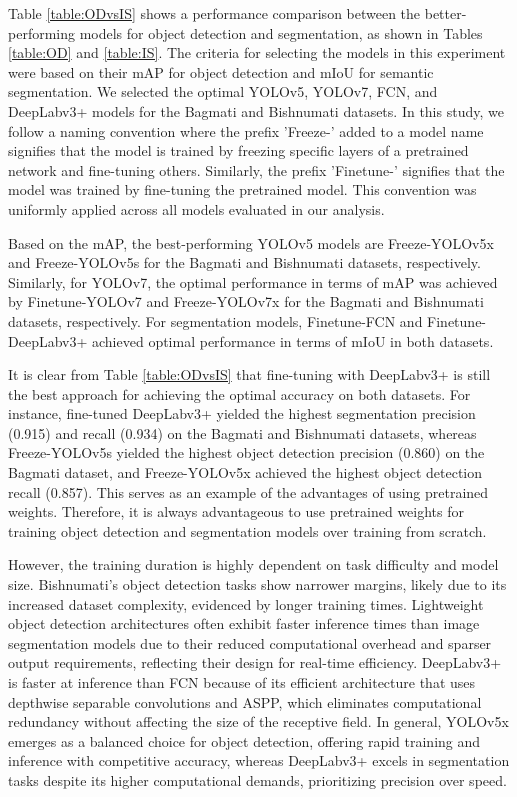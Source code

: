 \documentclass{ieeeaccess}
\begin{document}
Table \ref{table:ODvsIS} shows a performance comparison between the better-performing models for object detection and segmentation, as shown in Tables \ref{table:OD} and \ref{table:IS}. The criteria for selecting the models in this experiment were based on their mAP for object detection and mIoU for semantic segmentation. We selected the optimal YOLOv5, YOLOv7, FCN, and DeepLabv3+ models for the Bagmati and Bishnumati datasets. In this study, we follow a naming convention where the prefix 'Freeze-' added to a model name signifies that the model is trained by freezing specific layers of a pretrained network and fine-tuning others. Similarly, the prefix 'Finetune-' signifies that the model was trained by fine-tuning the pretrained model. This convention was uniformly applied across all models evaluated in our analysis.

Based on the mAP, the best-performing YOLOv5 models are Freeze-YOLOv5x and Freeze-YOLOv5s for the Bagmati and Bishnumati datasets, respectively. Similarly, for YOLOv7, the optimal performance in terms of mAP was achieved by Finetune-YOLOv7 and Freeze-YOLOv7x for the Bagmati and Bishnumati datasets, respectively. For segmentation models, Finetune-FCN and Finetune-DeepLabv3+ achieved optimal performance in terms of mIoU in both datasets.

It is clear from Table \ref{table:ODvsIS} that fine-tuning with DeepLabv3+ is still the best approach for achieving the optimal accuracy on both datasets. For instance, fine-tuned DeepLabv3+ yielded the highest segmentation precision (0.915) and recall (0.934) on the Bagmati and Bishnumati datasets, whereas Freeze-YOLOv5s yielded the highest object detection precision (0.860) on the Bagmati dataset, and Freeze-YOLOv5x achieved the highest object detection recall (0.857). This serves as an example of the advantages of using pretrained weights. Therefore, it is always advantageous to use pretrained weights for training object detection and segmentation models over training from scratch. 

However, the training duration is highly dependent on task difficulty and model size. Bishnumati’s object detection tasks show narrower margins, likely due to its increased dataset complexity, evidenced by longer training times. Lightweight object detection architectures often exhibit faster inference times than image segmentation models due to their reduced computational overhead and sparser output requirements, reflecting their design for real-time efficiency. DeepLabv3+ is faster at inference than FCN because of its efficient architecture that uses depthwise separable convolutions and ASPP, which eliminates computational redundancy without affecting the size of the receptive field. In general, YOLOv5x emerges as a balanced choice for object detection, offering rapid training and inference with competitive accuracy, whereas DeepLabv3+ excels in segmentation tasks despite its higher computational demands, prioritizing precision over speed.
\end{document}
